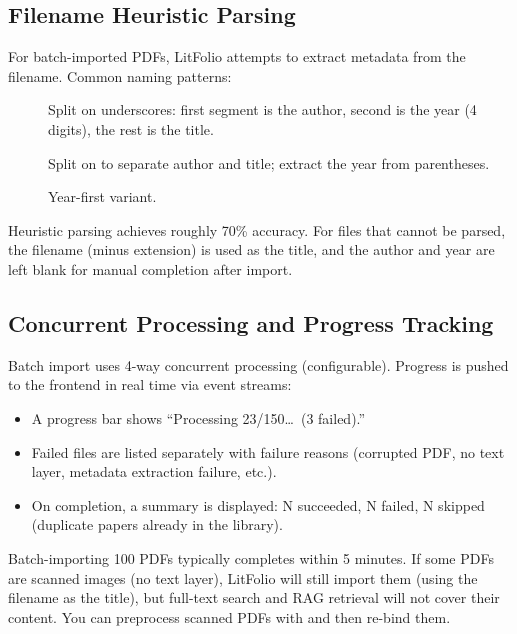 \subsection{Filename Heuristic Parsing}

For batch-imported PDFs, LitFolio attempts to extract metadata from the filename.
Common naming patterns:

\begin{description}
  \item[] Split on underscores: first segment is the
    author, second is the year (4 digits), the rest is the title.
  \item[] Split on \cmd{ - } to separate author and
    title; extract the year from parentheses.
  \item[] Year-first variant.
\end{description}

Heuristic parsing achieves roughly 70\% accuracy. For files that cannot be parsed,
the filename (minus extension) is used as the title, and the author and year are left
blank for manual completion after import.

\subsection{Concurrent Processing and Progress Tracking}

Batch import uses 4-way concurrent processing (configurable). Progress is pushed to
the frontend in real time via event streams:

\begin{itemize}
  \item A progress bar shows ``Processing 23/150\ldots\ (3 failed).''
  \item Failed files are listed separately with failure reasons (corrupted PDF, no text
    layer, metadata extraction failure, etc.).
  \item On completion, a summary is displayed: N succeeded, N failed, N skipped
    (duplicate papers already in the library).
\end{itemize}

\begin{tipbox}
Batch-importing 100 PDFs typically completes within 5 minutes. If some PDFs are
scanned images (no text layer), LitFolio will still import them (using the filename
as the title), but full-text search and RAG retrieval will not cover their content.
You can preprocess scanned PDFs with  and then re-bind them.
\end{tipbox}


